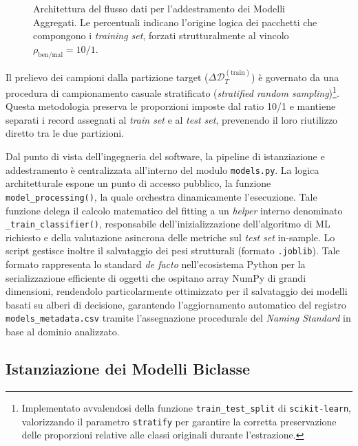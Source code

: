 \begin{figure}[H]
    \caption{Architettura del flusso dati per l'addestramento dei Modelli Aggregati. Le percentuali indicano l'origine logica dei pacchetti che compongono i \textit{training set}, forzati strutturalmente al vincolo $\rho_{\text{ben/mal}} = 10/1$.}
    \label{fig:aggregati_data_flow}
\end{figure}

Il prelievo dei campioni dalla partizione target ($\Delta\mathcal{D}_T^{(\text{train})}$) è governato da una procedura di campionamento casuale stratificato (\textit{stratified random sampling})\footnote{Implementato avvalendosi della funzione \texttt{train\_test\_split} di \texttt{scikit-learn}, valorizzando il parametro \texttt{stratify} per garantire la corretta preservazione delle proporzioni relative alle classi originali durante l'estrazione.}. 
Questa metodologia preserva le proporzioni imposte dal ratio 10/1 e mantiene separati i record assegnati al \textit{train set} e al \textit{test set}, prevenendo il loro riutilizzo diretto tra le due partizioni.

Dal punto di vista dell'ingegneria del software, la pipeline di istanziazione e addestramento è centralizzata all'interno del modulo \texttt{models.py}. 
La logica architetturale espone un punto di accesso pubblico, la funzione \texttt{model\_processing()}, la quale orchestra dinamicamente l'esecuzione. 
Tale funzione delega il calcolo matematico del fitting a un \textit{helper} interno denominato \texttt{\_train\_classifier()}, responsabile dell'inizializzazione dell'algoritmo di ML richiesto e della valutazione asincrona delle metriche sul \textit{test set} in-sample. 
Lo script gestisce inoltre il salvataggio dei pesi strutturali (formato \texttt{.joblib}). Tale formato rappresenta lo standard \textit{de facto} nell'ecosistema Python per la serializzazione efficiente di oggetti che ospitano array NumPy di grandi dimensioni, rendendolo particolarmente ottimizzato per il salvataggio dei modelli basati su alberi di decisione, garantendo l'aggiornamento automatico del registro \texttt{models\_metadata.csv} tramite l'assegnazione procedurale del \textit{Naming Standard} in base al dominio analizzato.

\subsection{Istanziazione dei Modelli Biclasse}
\label{subsec:istanziazione_biclasse}

